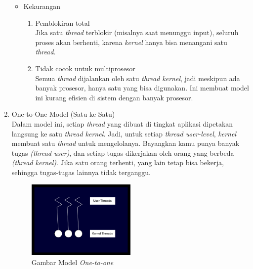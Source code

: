 \documentclass[12pt]{article}
\begin{document}
\begin{enumerate}
\begin{itemize}
        \item Kekurangan \\
            \begin{enumerate}
                \item Pemblokiran total \\
                Jika satu \textit{thread} terblokir (misalnya saat menunggu input), 
                seluruh proses akan berhenti, karena \textit{kernel} hanya bisa menangani satu \textit{thread}.
                \item Tidak cocok untuk multiprosesor \\
                Semua \textit{thread} dijalankan oleh satu \textit{thread kernel}, jadi meskipun ada banyak prosesor, hanya satu yang bisa 
                digunakan. Ini membuat model ini kurang efisien di sistem dengan banyak prosesor.
            \end{enumerate}
    \end{itemize}


    
    \item One-to-One Model (Satu ke Satu)\\
    Dalam model ini, setiap \textit{thread} yang dibuat di tingkat aplikasi dipetakan langsung ke satu \textit{thread kernel.}
    Jadi, untuk setiap \textit{thread user-level}, \textit{kernel} membuat satu \textit{thread} untuk mengelolanya.
    Bayangkan kamu punya banyak tugas \textit{(thread user)}, dan setiap tugas dikerjakan 
    oleh orang yang berbeda \textit{(thread kernel)}. Jika satu orang terhenti, yang lain tetap bisa bekerja, sehingga tugas-tugas lainnya tidak terganggu.
    \begin{figure}[h]
        \centering
        \includegraphics[width=0.5\textwidth]{asset/gambar-model-multithreading-one-to-one.jpg}
        \caption{Gambar Model \textit{One-to-one}}
    \end{figure}


\end{enumerate}
\end{document}
